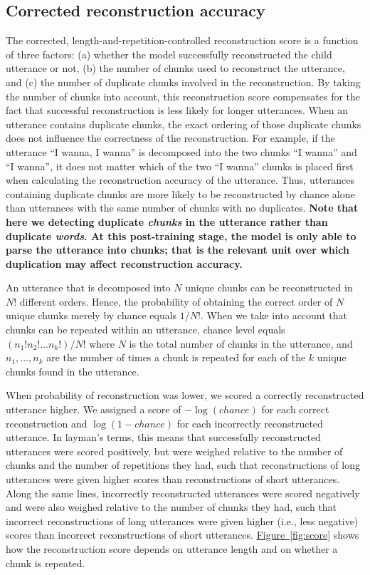 \documentclass[man,mask,floatsintext]{apa6}
\begin{document}
\subsection{Corrected reconstruction
accuracy}\label{corrected-reconstruction-accuracy}

The corrected, length-and-repetition-controlled reconstruction score is
a function of three factors: (a) whether the model successfully
reconstructed the child utterance or not, (b) the number of chunks used
to reconstruct the utterance, and (c) the number of duplicate chunks
involved in the reconstruction. By taking the number of chunks into
account, this reconstruction score compensates for the fact that
successful reconstruction is less likely for longer utterances. When an
utterance contains duplicate chunks, the exact ordering of those
duplicate chunks does not influence the correctness of the
reconstruction. For example, if the utterance \enquote{I wanna, I wanna}
is decomposed into the two chunks \enquote{I wanna} and \enquote{I
wanna}, it does not matter which of the two \enquote{I wanna} chunks is
placed first when calculating the reconstruction accuracy of the
utterance. Thus, utterances containing duplicate chunks are more likely
to be reconstructed by chance alone than utterances with the same number
of chunks with no duplicates. \textbf{Note that here we detecting
duplicate \emph{chunks} in the utterance rather than duplicate
\emph{words}. At this post-training stage, the model is only able to
parse the utterance into chunks; that is the relevant unit over which
duplication may affect reconstruction accuracy.}

An utterance that is decomposed into \(N\) unique chunks can be
reconstructed in \(N!\) different orders. Hence, the probability of
obtaining the correct order of \(N\) unique chunks merely by chance
equals \(1/N!\). When we take into account that chunks can be repeated
within an utterance, chance level equals \((n_1!n_2!\ldots n_k!)/N!\)
where \(N\) is the total number of chunks in the utterance, and
\(n_1,\ldots,n_k\) are the number of times a chunk is repeated for each
of the \(k\) unique chunks found in the utterance.

When probability of reconstruction was lower, we scored a correctly
reconstructed utterance higher. We assigned a score of \(-\log(chance)\)
for each correct reconstruction and \(\log(1-chance)\) for each
incorrectly reconstructed utterance. In layman's terms, this means that
successfully reconstructed utterances were scored positively, but were
weighed relative to the number of chunks and the number of repetitions
they had, such that reconstructions of long utterances were given higher
scores than reconstructions of short utterances. Along the same lines,
incorrectly reconstructed utterances were scored negatively and were
also weighed relative to the number of chunks they had, such that
incorrect reconstructions of long utterances were given higher (i.e.,
less negative) scores than incorrect reconstructions of short
utterances. \protect\hyperlink{fig4}{Figure~\ref{fig:score}} shows how the 
reconstruction score depends on utterance length and on whether a chunk is 
repeated.
\end{document}
